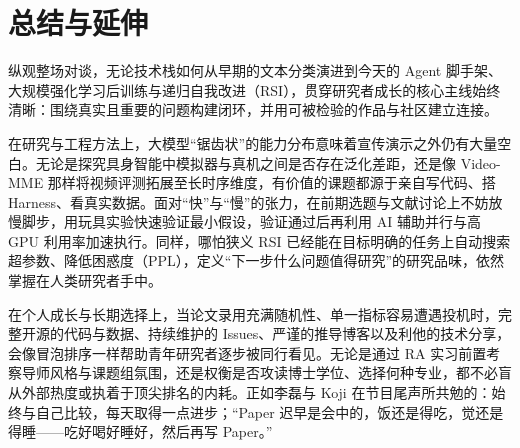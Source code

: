 \documentclass[UTF8,a4paper,11pt,fontset=fandol]{ctexart}
\begin{document}
\section{总结与延伸}
纵观整场对谈，无论技术栈如何从早期的文本分类演进到今天的 Agent 脚手架、大规模强化学习后训练与递归自我改进（RSI），贯穿研究者成长的核心主线始终清晰：围绕真实且重要的问题构建闭环，并用可被检验的作品与社区建立连接。

在研究与工程方法上，大模型“锯齿状”的能力分布意味着宣传演示之外仍有大量空白。无论是探究具身智能中模拟器与真机之间是否存在泛化差距，还是像 Video-MME 那样将视频评测拓展至长时序维度，有价值的课题都源于亲自写代码、搭 Harness、看真实数据。面对“快”与“慢”的张力，在前期选题与文献讨论上不妨放慢脚步，用玩具实验快速验证最小假设，验证通过后再利用 AI 辅助并行与高 GPU 利用率加速执行。同样，哪怕狭义 RSI 已经能在目标明确的任务上自动搜索超参数、降低困惑度（PPL），定义“下一步什么问题值得研究”的研究品味，依然掌握在人类研究者手中。

在个人成长与长期选择上，当论文录用充满随机性、单一指标容易遭遇投机时，完整开源的代码与数据、持续维护的 Issues、严谨的推导博客以及利他的技术分享，会像冒泡排序一样帮助青年研究者逐步被同行看见。无论是通过 RA 实习前置考察导师风格与课题组氛围，还是权衡是否攻读博士学位、选择何种专业，都不必盲从外部热度或执着于顶尖排名的内耗。正如李磊与 Koji 在节目尾声所共勉的：始终与自己比较，每天取得一点进步；“Paper 迟早是会中的，饭还是得吃，觉还是得睡——吃好喝好睡好，然后再写 Paper。”
\end{document}
